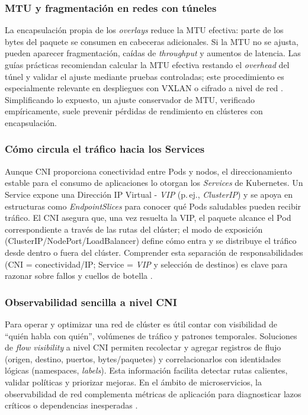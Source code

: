 \documentclass[journal]{IEEEtran}
\begin{document}
\subsubsection{MTU y fragmentación en redes con túneles}
La encapsulación propia de los \emph{overlays} reduce la MTU efectiva: parte de los bytes del paquete se consumen en cabeceras adicionales. Si la MTU no se ajusta, pueden aparecer fragmentación, caídas de \emph{throughput} y aumentos de latencia. Las guías prácticas recomiendan calcular la MTU efectiva restando el \emph{overhead} del túnel y validar el ajuste mediante pruebas controladas; este procedimiento es especialmente relevante en despliegues con VXLAN o cifrado a nivel de red \cite{ref12}. Simplificando lo expuesto, un ajuste conservador de MTU, verificado empíricamente, suele prevenir pérdidas de rendimiento en clústeres con encapsulación.



\subsubsection{Cómo circula el tráfico hacia los Services}
Aunque CNI proporciona conectividad entre Pods y nodos, el direccionamiento estable para el consumo de aplicaciones lo otorgan los \emph{Services} de Kubernetes. Un Service expone una Dirección IP Virtual - \emph{VIP} (p.\,ej., \emph{ClusterIP}) y se apoya en estructuras como \emph{EndpointSlices} para conocer qué Pods saludables pueden recibir tráfico. El CNI asegura que, una vez resuelta la VIP, el paquete alcance el Pod correspondiente a través de las rutas del clúster; el modo de exposición (ClusterIP/NodePort/LoadBalancer) define cómo entra y se distribuye el tráfico desde dentro o fuera del clúster. Comprender esta separación de responsabilidades (CNI = conectividad/IP; Service = \emph{VIP} y selección de destinos) es clave para razonar sobre fallos y cuellos de botella \cite{ref3,ref13,ref1,ref2}.

\subsubsection{Observabilidad sencilla a nivel CNI}
Para operar y optimizar una red de clúster es útil contar con visibilidad de “quién habla con quién”, volúmenes de tráfico y patrones temporales. Soluciones de \emph{flow visibility} a nivel CNI permiten recolectar y agregar registros de flujo (origen, destino, puertos, bytes/paquetes) y correlacionarlos con identidades lógicas (namespaces, \emph{labels}). Esta información facilita detectar rutas calientes, validar políticas y priorizar mejoras. En el ámbito de microservicios, la observabilidad de red complementa métricas de aplicación para diagnosticar lazos críticos o dependencias inesperadas \cite{ref23,ref6}.
\end{document}
